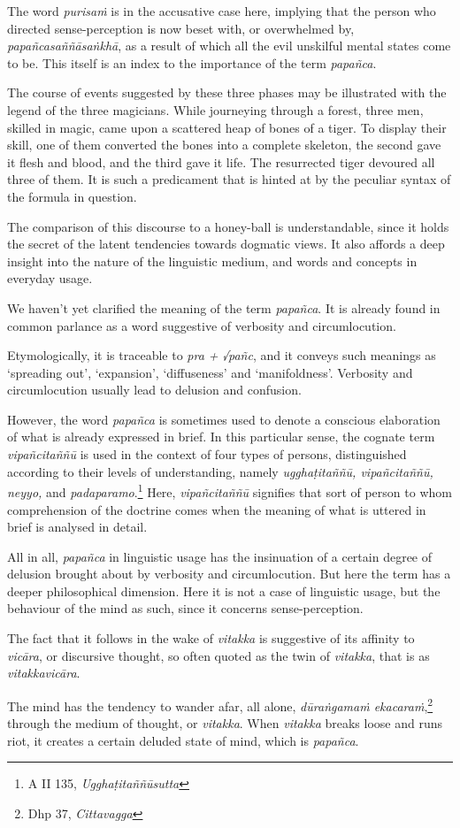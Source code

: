 The word \emph{purisaṁ} is in the accusative case here, implying that the person who directed sense-perception is now beset with, or overwhelmed by, \emph{papañcasaññāsaṅkhā}, as a result of which all the evil unskilful mental states come to be. This itself is an index to the importance of the term \emph{papañca}.

The course of events suggested by these three phases may be illustrated with the legend of the three magicians. While journeying through a forest, three men, skilled in magic, came upon a scattered heap of bones of a tiger. To display their skill, one of them converted the bones into a complete skeleton, the second gave it flesh and blood, and the third gave it life. The resurrected tiger devoured all three of them. It is such a predicament that is hinted at by the peculiar syntax of the formula in question.

The comparison of this discourse to a honey-ball is understandable, since it holds the secret of the latent tendencies towards dogmatic views. It also affords a deep insight into the nature of the linguistic medium, and words and concepts in everyday usage.

We haven't yet clarified the meaning of the term \emph{papañca}. It is already found in common parlance as a word suggestive of verbosity and circumlocution.

Etymologically, it is traceable to \emph{pra + √pañc}, and it conveys such meanings as `spreading out', `expansion', `diffuseness' and `manifoldness'. Verbosity and circumlocution usually lead to delusion and confusion.

However, the word \emph{papañca} is sometimes used to denote a conscious elaboration of what is already expressed in brief. In this particular sense, the cognate term \emph{vipañcitaññū} is used in the context of four types of persons, distinguished according to their levels of understanding, namely \emph{ugghaṭitaññū, vipañcitaññū, neyyo,} and \emph{padaparamo}.\footnote{A II 135, \emph{Ugghaṭitaññūsutta}} Here, \emph{vipañcitaññū} signifies that sort of person to whom comprehension of the doctrine comes when the meaning of what is uttered in brief is analysed in detail.

All in all, \emph{papañca} in linguistic usage has the insinuation of a certain degree of delusion brought about by verbosity and circumlocution. But here the term has a deeper philosophical dimension. Here it is not a case of linguistic usage, but the behaviour of the mind as such, since it concerns sense-perception.

The fact that it follows in the wake of \emph{vitakka} is suggestive of its affinity to \emph{vicāra}, or discursive thought, so often quoted as the twin of \emph{vitakka}, that is as \emph{vitakkavicāra}.

The mind has the tendency to wander afar, all alone, \emph{dūraṅgamaṁ ekacaraṁ},\footnote{Dhp 37, \emph{Cittavagga}} through the medium of thought, or \emph{vitakka}. When \emph{vitakka} breaks loose and runs riot, it creates a certain deluded state of mind, which is \emph{papañca}.
